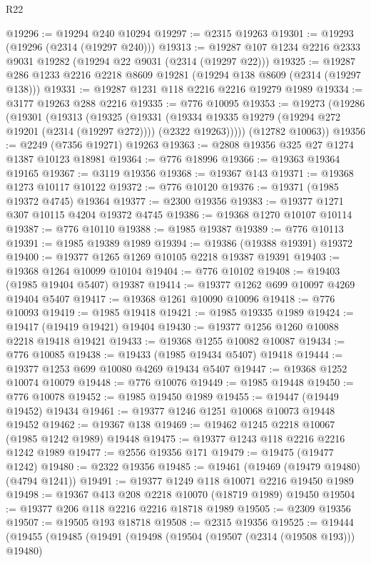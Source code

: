\begin{lexlean}{R22}
\begin{coremodule}
@19296 := @19294 @240 @10294
@19297 := @2315 @19263
@19301 := @19293 (@19296 (@2314 (@19297 @240)))
@19313 := @19287 @107 @1234 @2216 @2333 @9031 @19282 (@19294 @22 @9031 (@2314 (@19297 @22)))
@19325 := @19287 @286 @1233 @2216 @2218 @8609 @19281 (@19294 @138 @8609 (@2314 (@19297 @138)))
@19331 := @19287 @1231 @118 @2216 @2216 @19279 @1989
@19334 := @3177 @19263 @288 @2216
@19335 := @776 @10095
@19353 := @19273
    (@19286
      (@19301
        (@19313
          (@19325
            (@19331
              (@19334 @19335 @19279 (@19294 @272 @19201 (@2314 (@19297 @272))))
              (@2322 @19263)))))
      (@12782 @10063))
@19356 := @2249 (@7356 @19271) @19263
@19363 := @2808 @19356 @325 @27 @1274 @1387 @10123 @18981
@19364 := @776 @18996
@19366 := @19363 @19364 @19165
@19367 := @3119 @19356
@19368 := @19367 @143
@19371 := @19368 @1273 @10117 @10122
@19372 := @776 @10120
@19376 := @19371 (@1985 @19372 @4745) @19364
@19377 := @2300 @19356
@19383 := @19377 @1271 @307 @10115 @4204 @19372 @4745
@19386 := @19368 @1270 @10107 @10114
@19387 := @776 @10110
@19388 := @1985 @19387
@19389 := @776 @10113
@19391 := @1985 @19389 @1989
@19394 := @19386 (@19388 @19391) @19372
@19400 := @19377 @1265 @1269 @10105 @2218 @19387 @19391
@19403 := @19368 @1264 @10099 @10104
@19404 := @776 @10102
@19408 := @19403 (@1985 @19404 @5407) @19387
@19414 := @19377 @1262 @699 @10097 @4269 @19404 @5407
@19417 := @19368 @1261 @10090 @10096
@19418 := @776 @10093
@19419 := @1985 @19418
@19421 := @1985 @19335 @1989
@19424 := @19417 (@19419 @19421) @19404
@19430 := @19377 @1256 @1260 @10088 @2218 @19418 @19421
@19433 := @19368 @1255 @10082 @10087
@19434 := @776 @10085
@19438 := @19433 (@1985 @19434 @5407) @19418
@19444 := @19377 @1253 @699 @10080 @4269 @19434 @5407
@19447 := @19368 @1252 @10074 @10079
@19448 := @776 @10076
@19449 := @1985 @19448
@19450 := @776 @10078
@19452 := @1985 @19450 @1989
@19455 := @19447 (@19449 @19452) @19434
@19461 := @19377 @1246 @1251 @10068 @10073 @19448 @19452
@19462 := @19367 @138
@19469 := @19462 @1245 @2218 @10067 (@1985 @1242 @1989) @19448
@19475 := @19377 @1243 @118 @2216 @2216 @1242 @1989
@19477 := @2556 @19356 @171
@19479 := @19475 (@19477 @1242)
@19480 := @2322 @19356
@19485 := @19461 (@19469 (@19479 @19480) (@4794 @1241))
@19491 := @19377 @1249 @118 @10071 @2216 @19450 @1989
@19498 := @19367 @413 @208 @2218 @10070 (@18719 @1989) @19450
@19504 := @19377 @206 @118 @2216 @2216 @18718 @1989
@19505 := @2309 @19356
@19507 := @19505 @193 @18718
@19508 := @2315 @19356
@19525 := @19444
    (@19455
      (@19485
        (@19491
          (@19498
            (@19504 (@19507 (@2314 (@19508 @193))) @19480)

\end{coremodule}
\end{lexlean}
